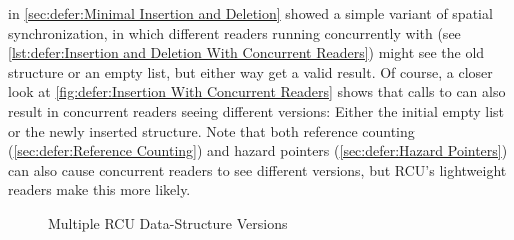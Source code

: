in
\cref{sec:defer:Minimal Insertion and Deletion}
showed a simple variant of spatial synchronization, in which different
readers running concurrently with 
(see \cref{lst:defer:Insertion and Deletion With Concurrent Readers})
might see the old  structure or an empty list, but either
way get a valid result.
Of course, a closer look at
\cref{fig:defer:Insertion With Concurrent Readers}
shows that calls to  can also result in concurrent
readers seeing different versions:
Either the initial empty list or the newly inserted  structure.
Note that both reference counting
(\cref{sec:defer:Reference Counting})
and hazard pointers
(\cref{sec:defer:Hazard Pointers})
can also cause concurrent readers to see different versions, but
RCU's lightweight readers make this more likely.

\begin{figure}
\centering
{}
\caption{Multiple RCU Data-Structure Versions}
\label{fig:defer:Multiple RCU Data-Structure Versions}
\end{figure}


